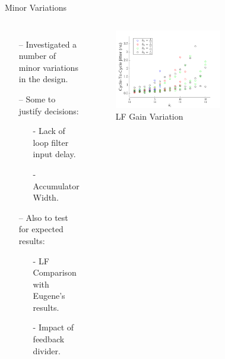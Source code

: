 \documentclass{beamer}
\begin{document}
\begin{frame}{Minor Variations}
\vspace{-0.6 cm}
	\begin{columns}
		\begin{itemize}
			\item[--]
			Investigated a number of minor variations in the design.
			\item[--]
			Some to justify decisions:%
			\begin{itemize}
				\item[-]
					Lack of loop filter input delay.
				\item[-]
					Accumulator Width.
			\end{itemize}  
			\item[--]
			Also to test for expected results:
			\begin{itemize}
				\item[-]
					LF Comparison with Eugene's results.
				\item[-]
					Impact of feedback divider.
			\end{itemize}
		\end{itemize}
		\begin{figure}
			\includegraphics[width=\linewidth]{../fixed_kp_zoom}
			\vspace{-0.8 cm}
			\caption{LF Gain Variation}
		\end{figure}
		\vspace{-1.1 cm}
		\begin{figure}

\end{figure}
\end{columns}
\end{frame}
\end{document}

